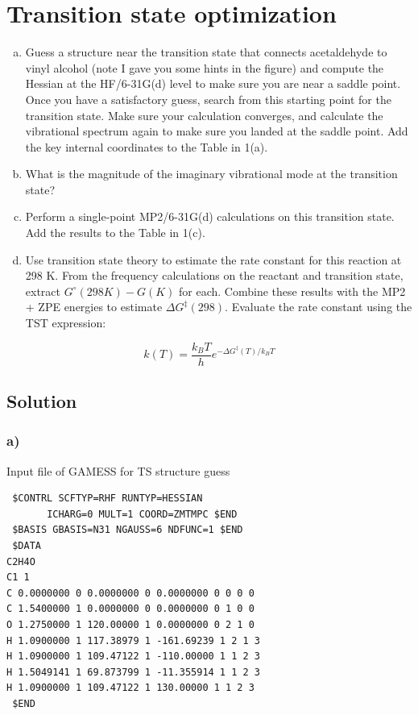 \documentclass[11pt]{article}
\begin{document}
\section{Transition state optimization}
\label{sec:org18fbbb7}
\begin{enumerate}[(a)]
\item Guess a structure near the transition state that connects acetaldehyde to vinyl alcohol (note I gave you some hints in the figure) and compute the Hessian at the HF/6-31G(d) level to make sure you are near a saddle point.  Once you have a satisfactory guess, search from this starting point for the transition state. Make sure your calculation converges, and calculate the vibrational spectrum again to make sure you landed at the saddle point. Add the key internal coordinates to the Table in 1(a).

\item What is the magnitude of the imaginary vibrational mode at the transition state?

\item Perform a single-point MP2/6-31G(d) calculations on this transition state. Add the results to the Table in 1(c).

\item Use transition state theory to estimate the rate constant for this reaction at 298 K.  From the frequency calculations on the reactant and transition state, extract \(G^{\circ}(298 K)- G( K)\) for each.  Combine these results with the MP2 + ZPE energies to estimate \(\Delta G^{\ddagger}(298)\).  Evaluate the rate constant using the TST expression:
\end{enumerate}

\begin{equation}
 k(T) =\frac{k_{B} T}{h} e^{-\Delta G^{\ddagger}(T)/k_{B}T}
\end{equation}


\subsection{Solution}
\label{sec:orgd3cf470}

\subsubsection{a)}
\label{sec:orgcdf6627}

Input file of GAMESS for TS structure guess
\begin{verbatim}
 $CONTRL SCFTYP=RHF RUNTYP=HESSIAN 
       ICHARG=0 MULT=1 COORD=ZMTMPC $END
 $BASIS GBASIS=N31 NGAUSS=6 NDFUNC=1 $END
 $DATA
C2H4O
C1 1
C 0.0000000 0 0.0000000 0 0.0000000 0 0 0 0
C 1.5400000 1 0.0000000 0 0.0000000 0 1 0 0
O 1.2750000 1 120.00000 1 0.0000000 0 2 1 0
H 1.0900000 1 117.38979 1 -161.69239 1 2 1 3
H 1.0900000 1 109.47122 1 -110.00000 1 1 2 3
H 1.5049141 1 69.873799 1 -11.355914 1 1 2 3
H 1.0900000 1 109.47122 1 130.00000 1 1 2 3
 $END
\end{verbatim}
\end{document}

